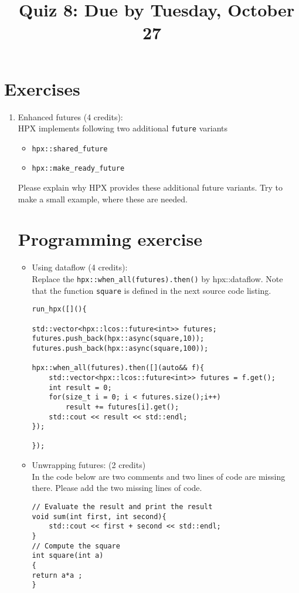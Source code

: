 \documentclass[11pt]{article}
\begin{document}
\title{\coursename~Quiz 8: Due by Tuesday, October 27}
\date{}
\maketitle

\medskip


\section*{Exercises}

\begin{enumerate}
\item Enhanced futures (4 credits): \\
HPX implements following two additional \lstinline|future| variants
\begin{itemize}
\item \lstinline|hpx::shared_future|
\item \lstinline|hpx::make_ready_future|
\end{itemize}
Please explain why HPX provides these additional future variants. Try to make a small example, where these are needed.

\section*{Programming exercise}

\begin{itemize}
\item Using dataflow (4 credits): \\
Replace the \lstinline|hpx::when_all(futures).then()| by hpx::dataflow. Note that the function \lstinline|square| is defined in the next source code listing.
\begin{lstlisting}
run_hpx([](){

std::vector<hpx::lcos::future<int>> futures;
futures.push_back(hpx::async(square,10));
futures.push_back(hpx::async(square,100));

hpx::when_all(futures).then([](auto&& f){
    std::vector<hpx::lcos::future<int>> futures = f.get();
    int result = 0;
    for(size_t i = 0; i < futures.size();i++)
        result += futures[i].get();
    std::cout << result << std::endl;
});

});
\end{lstlisting}

\item Unwrapping futures: (2 credits)\\
In the code below are two comments and two lines of code are missing there. Please add the two missing lines of code.
\begin{lstlisting}
// Evaluate the result and print the result
void sum(int first, int second){
	std::cout << first + second << std::endl;
}
// Compute the square 
int square(int a)
{
return a*a ;
}


\end{lstlisting}
\end{itemize}
\end{enumerate}
\end{document}
